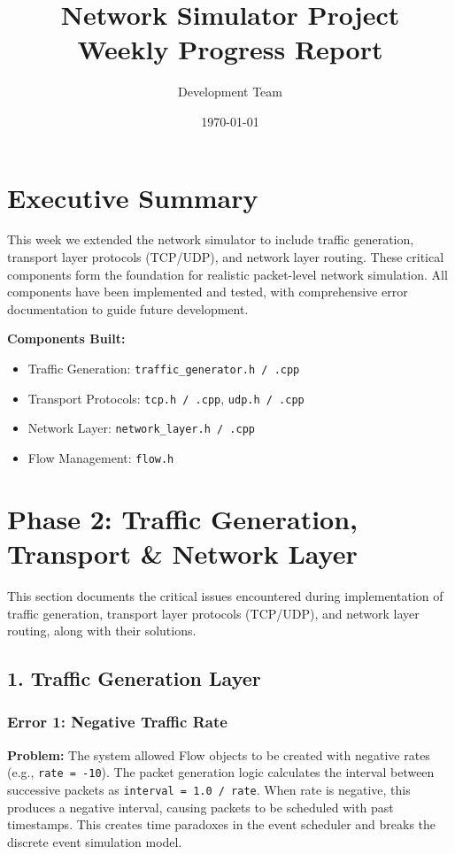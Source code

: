 \documentclass[11pt,a4paper]{article}
\title{\textbf{Network Simulator Project} \\ \large{Weekly Progress Report}}
\author{Development Team}
\date{\today}
\begin{document}
\maketitle

\section{Executive Summary}

This week we extended the network simulator to include traffic generation, transport layer protocols (TCP/UDP), and network layer routing. These critical components form the foundation for realistic packet-level network simulation. All components have been implemented and tested, with comprehensive error documentation to guide future development.

\vspace{0.3cm}

\textbf{Components Built:}
\begin{itemize}
    \item Traffic Generation: \texttt{traffic\_generator.h / .cpp}
    \item Transport Protocols: \texttt{tcp.h / .cpp}, \texttt{udp.h / .cpp}
    \item Network Layer: \texttt{network\_layer.h / .cpp}
    \item Flow Management: \texttt{flow.h}
\end{itemize}


\section{Phase 2: Traffic Generation, Transport \& Network Layer}

This section documents the critical issues encountered during implementation of traffic generation, transport layer protocols (TCP/UDP), and network layer routing, along with their solutions.

\subsection{1. Traffic Generation Layer}

\subsubsection{Error 1: Negative Traffic Rate}

\textbf{Problem:}
The system allowed Flow objects to be created with negative rates (e.g., \texttt{rate = -10}). The packet generation logic calculates the interval between successive packets as \texttt{interval = 1.0 / rate}. When rate is negative, this produces a negative interval, causing packets to be scheduled with past timestamps. This creates time paradoxes in the event scheduler and breaks the discrete event simulation model.
\end{document}
